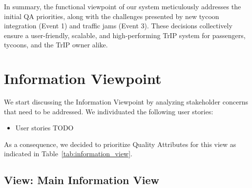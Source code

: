 In summary, the functional viewpoint of our system meticulously addresses the initial QA priorities, along with the challenges presented by new tycoon integration (Event 1) and traffic jams (Event 3). These decisions collectively ensure a user-friendly, scalable, and high-performing TrIP system for passengers, tycoons, and the TrIP owner alike.
\section{Information Viewpoint}
We start discussing the Information Viewpoint by analyzing stakeholder concerns that need to be addressed.
We individuated the following user stories:
\begin{itemize}
    \item User stories TODO
\end{itemize}

As a consequence, we decided to prioritize Quality Attributes for this view as indicated in Table~\ref{tab:information_view}.

\begin{table}[h!]
    \centering
    \caption{Information View Prioritized Quality Attributes}
    \label{tab:information_view}
\end{table}

\subsection{View: Main Information View}
